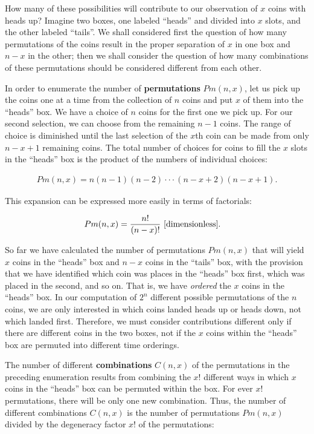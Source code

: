 \documentclass[a4paper,10pt]{article}
\begin{document}
{\noindent}How many of these possibilities will contribute to our observation of $x$ coins with heads up? Imagine two boxes, one labeled ``heads'' and divided into $x$ slots, and the other labeled ``tails''. We shall considered first the question of how many permutations of the coins result in the proper separation of $x$ in one box and $n-x$ in the other; then we shall consider the question of how many combinations of these permutations should be considered different from each other.

{\noindent}In order to enumerate the number of \textbf{permutations} $Pm(n,x)$, let us pick up the coins one at a time from the collection of $n$ coins and put $x$ of them into the ``heads'' box. We have a choice of $n$ coins for the first one we pick up. For our second selection, we can choose from the remaining $n-1$ coins. The range of choice is diminished until the last selection of the $x$th coin can be made from only $n-x+1$ remaining coins. The total number of choices for coins to fill the $x$ slots in the ``heads'' box is the product of the numbers of individual choices:

\begin{align*}
    Pm(n,x) = n(n-1)(n-2) \cdot\cdot\cdot (n-x+2)(n-x+1).
\end{align*}

{\noindent}This expansion can be expressed more easily in terms of factorials:

\begin{align*}
    Pm(n,x) &= \frac{n!}{(n-x)!} ~ [{\rm dimensionless}].
\end{align*}

{\noindent}So far we have calculated the number of permutations $Pm(n,x)$ that will yield $x$ coins in the ``heads'' box and $n-x$ coins in the ``tails'' box, with the provision that we have identified which coin was places in the ``heads'' box first, which was placed in the second, and so on. That is, we have \textit{ordered} the $x$ coins in the ``heads'' box. In our computation of $2^n$ different possible permutations of the $n$ coins, we are only interested in which coins landed heads up or heads down, not which landed first. Therefore, we must consider contributions different only if there are different coins in the two boxes, not if the $x$ coins within the ``heads'' box are permuted into different time orderings.

{\noindent}The number of different \textbf{combinations} $C(n,x)$ of the permutations in the preceding enumeration results from combining the $x!$ different ways in which $x$ coins in the ``heads'' box can be permuted within the box. For ever $x!$ permutations, there will be only one new combination. Thus, the number of different combinations $C(n,x)$ is the number of permutations $Pm(n,x)$ divided by the degeneracy factor $x!$ of the permutations:
\end{document}
